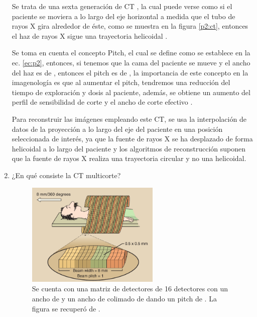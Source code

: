 \begin{enumerate}[1.]
Se trata de una sexta generación de CT \citep{IM}, la cual puede verse como si el paciente se moviera a lo largo del eje horizontal a medida que el tubo de rayos X gira alrededor de éste, como se muestra en la figura \ref{p2:ct}, entonces el haz de rayos X sigue una trayectoria helicoidal \citep{stewart}. 

Se toma en cuenta el concepto Pitch, el cual se define como se establece en la ec. \ref{ec:p2}, entonces, si tenemos que la cama del paciente se mueve  y el ancho del haz es de , entonces el pitch es de , la importancia de este concepto en la imagenología es que al aumentar el pitch, tendremos una reducción del tiempo de exploración y dosis al paciente, además, se obtiene un aumento del perfil de sensibilidad de corte y el ancho de corte efectivo \citep{stewart,jerro}.




Para reconstruir las imágenes empleando este CT, se usa la interpolación de datos de la proyección a lo largo del eje del paciente en una posición seleccionada de interés, ya que la fuente de rayos X se ha desplazado de forma helicoidal a lo largo del paciente  y los algoritmos de reconstrucción suponen que la fuente de rayos X realiza una trayectoria circular y no una helicoidal.









\item ¿En qué consiste la CT multicorte?

\begin{figure}[!ht]
  \centering
  \includegraphics[width=0.6\textwidth]{./figuras/p3_ct.png}
  \caption{Se cuenta con una matriz de detectores de 16 detectores con un ancho de  y un ancho de colimado de  dando un pitch de . La figura se recuperó de \citep{stewart}.}
  \label{p3:ct}
  \end{figure}



\end{enumerate}
